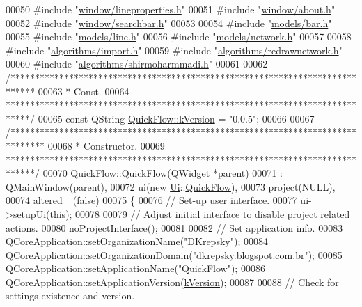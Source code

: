 \begin{DoxyCode}
00050 \textcolor{preprocessor}{#include "\hyperlink{lineproperties_8h}{window/lineproperties.h}"}
00051 \textcolor{preprocessor}{#include "\hyperlink{about_8h}{window/about.h}"}
00052 \textcolor{preprocessor}{#include "\hyperlink{searchbar_8h}{window/searchbar.h}"}
00053 
00054 \textcolor{preprocessor}{#include "\hyperlink{bar_8h}{models/bar.h}"}
00055 \textcolor{preprocessor}{#include "\hyperlink{line_8h}{models/line.h}"}
00056 \textcolor{preprocessor}{#include "\hyperlink{network_8h}{models/network.h}"}
00057 
00058 \textcolor{preprocessor}{#include "\hyperlink{import_8h}{algorithms/import.h}"}
00059 \textcolor{preprocessor}{#include "\hyperlink{redrawnetwork_8h}{algorithms/redrawnetwork.h}"}
00060 \textcolor{preprocessor}{#include "\hyperlink{shirmoharmmadi_8h}{algorithms/shirmoharmmadi.h}"}
00061 
00062 \textcolor{comment}{/*****************************************************************************}
00063 \textcolor{comment}{* Const.}
00064 \textcolor{comment}{*****************************************************************************/}
00065 \textcolor{keyword}{const} QString \hyperlink{group___window_gabfc3b1280bdae9a9c046d56b1459ab99}{QuickFlow::kVersion} = \textcolor{stringliteral}{"0.0.5"};
00066 
00067 \textcolor{comment}{/*******************************************************************************}
00068 \textcolor{comment}{ * Constructor.}
00069 \textcolor{comment}{ ******************************************************************************/}
\hypertarget{quickflow_8cpp_source_l00070}{}\hyperlink{group___window_ga7689e2608835392fce3f4c95a7a542db}{00070} \hyperlink{group___window_ga7689e2608835392fce3f4c95a7a542db}{QuickFlow::QuickFlow}(QWidget *parent)
00071   : QMainWindow(parent),
00072     ui(new \hyperlink{namespace_ui}{Ui}::\hyperlink{class_quick_flow}{QuickFlow}),
00073     project(NULL),
00074     altered\_ (false)
00075 \{
00076   \textcolor{comment}{// Set-up user interface.}
00077   ui->setupUi(\textcolor{keyword}{this});
00078 
00079   \textcolor{comment}{// Adjust initial interface to disable project related actions.}
00080   noProjectInterface();
00081 
00082   \textcolor{comment}{// Set application info.}
00083   QCoreApplication::setOrganizationName(\textcolor{stringliteral}{"DKrepsky"});
00084   QCoreApplication::setOrganizationDomain(\textcolor{stringliteral}{"dkrepsky.blogspot.com.br"});
00085   QCoreApplication::setApplicationName(\textcolor{stringliteral}{"QuickFlow"});
00086   QCoreApplication::setApplicationVersion(\hyperlink{group___window_gabfc3b1280bdae9a9c046d56b1459ab99}{kVersion});
00087 
00088   \textcolor{comment}{// Check for settings existence and version.}

\end{DoxyCode}
